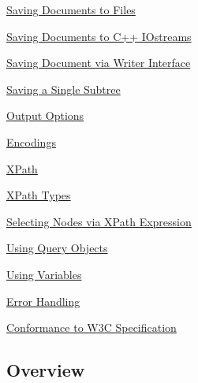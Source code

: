 \begin{DoxyItemize}
\begin{DoxyItemize}
\item \hyperlink{XMLManual_XMLSavingFile}{Saving Documents to Files}
\item \hyperlink{XMLManual_XMLSavingStreams}{Saving Documents to C++ IOstreams}
\item \hyperlink{XMLManual_XMLSavingWriter}{Saving Document via Writer Interface}
\item \hyperlink{XMLManual_XMLSavingSubtree}{Saving a Single Subtree}
\item \hyperlink{XMLManual_XMLSavingOptions}{Output Options}
\item \hyperlink{XMLManual_XMLSavingEncodings}{Encodings}
\end{DoxyItemize}
\item \hyperlink{XMLManual_XMLXPath}{XPath}
\begin{DoxyItemize}
\item \hyperlink{XMLManual_XMLXPathTypes}{XPath Types}
\item \hyperlink{XMLManual_XMLXPathSelecting}{Selecting Nodes via XPath Expression}
\item \hyperlink{XMLManual_XMLXPathQuery}{Using Query Objects}
\item \hyperlink{XMLManual_XMLXPathVariables}{Using Variables}
\item \hyperlink{XMLManual_XMLXPathError}{Error Handling}
\item \hyperlink{XMLManual_XMLXPathStandards}{Conformance to W3C Specification}
\end{DoxyItemize}
\end{DoxyItemize}

\par
 \par
 \hypertarget{XMLManual_XMLOverview}{}\subsection{Overview}\label{XMLManual_XMLOverview}

